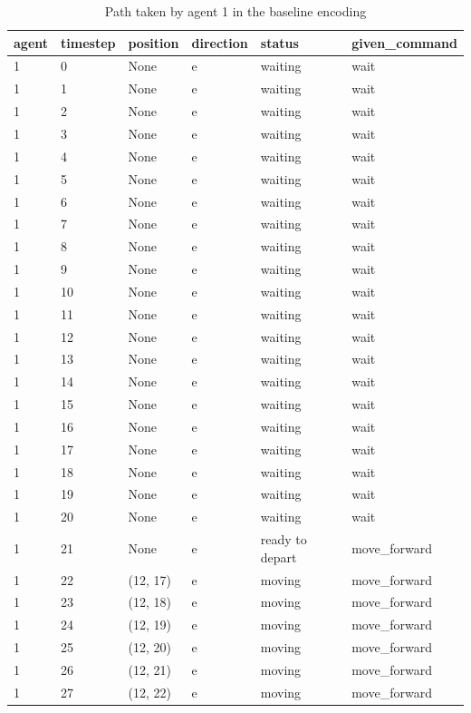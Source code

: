\documentclass[12pt, a4paper]{llncs}
\begin{document}
\begin{table}[htbp]
  \centering
  \caption{Path taken by agent 1 in the baseline encoding}
  \label{tab:baseline1}
  \begin{tabular}{llllll}
    \toprule
    agent & timestep & position & direction & status & given\_command \\
    \midrule
1 & 0 & None & e & waiting & wait \\
1 & 1 & None & e & waiting & wait \\
1 & 2 & None & e & waiting & wait \\
1 & 3 & None & e & waiting & wait \\
1 & 4 & None & e & waiting & wait \\
1 & 5 & None & e & waiting & wait \\
1 & 6 & None & e & waiting & wait \\
1 & 7 & None & e & waiting & wait \\
1 & 8 & None & e & waiting & wait \\
1 & 9 & None & e & waiting & wait \\
1 & 10 & None & e & waiting & wait \\
1 & 11 & None & e & waiting & wait \\
1 & 12 & None & e & waiting & wait \\
1 & 13 & None & e & waiting & wait \\
1 & 14 & None & e & waiting & wait \\
1 & 15 & None & e & waiting & wait \\
1 & 16 & None & e & waiting & wait \\
1 & 17 & None & e & waiting & wait \\
1 & 18 & None & e & waiting & wait \\
1 & 19 & None & e & waiting & wait \\
1 & 20 & None & e & waiting & wait \\
1 & 21 & None & e & ready to depart & move\_forward \\
1 & 22 & (12, 17) & e & moving & move\_forward \\
1 & 23 & (12, 18) & e & moving & move\_forward \\
1 & 24 & (12, 19) & e & moving & move\_forward \\
1 & 25 & (12, 20) & e & moving & move\_forward \\
1 & 26 & (12, 21) & e & moving & move\_forward \\
1 & 27 & (12, 22) & e & moving & move\_forward \\

\end{tabular}
\end{table}
\end{document}
